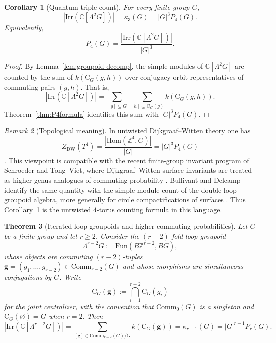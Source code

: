 \documentclass[11pt]{article}
\newtheorem{theorem}{Theorem}[section]
\newtheorem{corollary}[theorem]{Corollary}
\theoremstyle{definition}
\theoremstyle{remark}
\newtheorem{remark}[theorem]{Remark}
\theoremstyle{definition}
\theoremstyle{plain}
\newcommand{\Hom}{\mathrm{Hom}}
\newcommand{\Irr}{\mathrm{Irr}}
\newcommand{\C}{\mathrm{C}}
\newcommand{\Comm}{\mathrm{Comm}}
\begin{document}
\begin{corollary}[Quantum triple count]\label{cor:quantumtriple}
For every finite group $G$,
\[
|\Irr(\mathbb C[\Lambda^2G])|=\kappa_3(G)=|G|^3P_4(G).
\]
Equivalently,
\[
P_4(G)=\frac{|\Irr(\mathbb C[\Lambda^2G])|}{|G|^3}.
\]
\end{corollary}

\begin{proof}
By Lemma~\ref{lem:groupoid-decomp}, the simple modules of $\mathbb C[\Lambda^2G]$ are counted by the sum of
$k(\C_G(g,h))$ over conjugacy-orbit representatives of commuting pairs $(g,h)$.
That is,
\[
|\Irr(\mathbb C[\Lambda^2G])|=\sum_{[g]\subseteq G}~\sum_{[h]\subseteq \C_G(g)} k(\C_G(g,h)).
\]
Theorem~\ref{thm:P4formula} identifies this sum with $|G|^3P_4(G)$.
\end{proof}

\begin{remark}[Topological meaning]\label{rem:crosscircle}
In untwisted Dijkgraaf--Witten theory one has
\[
Z_{\mathrm{DW}}(T^4)=\frac{|\Hom(\mathbb Z^4,G)|}{|G|}
=|G|^3P_4(G)
\]
\cite{DijkgraafWitten1990,FreedQuinn1993}. This viewpoint is compatible with the recent finite-group invariant program of Schroeder and Tong--Viet, where Dijkgraaf--Witten surface invariants are treated as higher-genus analogues of commuting probability \cite{SchroederTongViet2025}. Bullivant and Delcamp identify the same quantity with the simple-module count of the double loop-groupoid algebra, more generally for circle compactifications of surfaces \cite{BullivantDelcampCrossCircle}. Thus Corollary~\ref{cor:quantumtriple} is the untwisted $4$-torus counting formula in this language.
\end{remark}

\begin{theorem}[Iterated loop groupoids and higher commuting probabilities]\label{thm:iterated-loop}
Let $G$ be a finite group and let $r\ge 2$.
Consider the $(r{-}2)$-fold loop groupoid
\[
\Lambda^{r-2}G := \mathrm{Fun}(B\mathbb Z^{r-2}, BG),
\]
whose objects are commuting $(r{-}2)$-tuples $\mathbf g=(g_1,\dots,g_{r-2})\in \Comm_{r-2}(G)$ and whose morphisms are simultaneous conjugations by $G$.
Write
\[
\C_G(\mathbf g):=\bigcap_{i=1}^{r-2}\C_G(g_i)
\]
for the joint centralizer, with the convention that $\Comm_0(G)$ is a singleton and $\C_G(\varnothing)=G$ when $r=2$.
Then
\[
|\Irr(\mathbb C[\Lambda^{r-2}G])|
=\sum_{[\mathbf g]\in \Comm_{r-2}(G)/G} k(\C_G(\mathbf g))
=\kappa_{r-1}(G)
=|G|^{r-1}P_r(G).
\]
\end{theorem}
\end{document}
